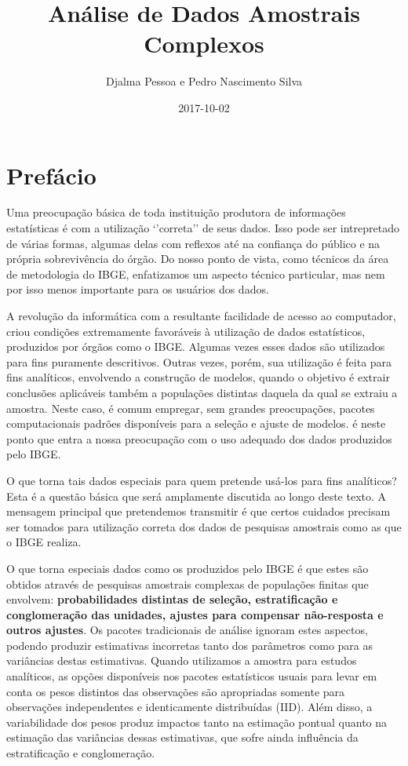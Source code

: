 \documentclass[]{book}
\title{Análise de Dados Amostrais Complexos}
\author{Djalma Pessoa e Pedro Nascimento Silva}
\date{2017-10-02}
\theoremstyle{definition}
\theoremstyle{definition}
\theoremstyle{definition}
\theoremstyle{remark}
\begin{document}
\maketitle

{
\setcounter{tocdepth}{1}
\tableofcontents
}
\chapter*{Prefácio}\label{prefacio}

Uma preocupação básica de toda instituição produtora de informações
estatísticas é com a utilização `'correta'' de seus dados. Isso pode ser
intrepretado de várias formas, algumas delas com reflexos até na
confiança do público e na própria sobrevivência do órgão. Do nosso ponto
de vista, como técnicos da área de metodologia do IBGE, enfatizamos um
aspecto técnico particular, mas nem por isso menos importante para os
usuários dos dados.

A revolução da informática com a resultante facilidade de acesso ao
computador, criou condições extremamente favoráveis à utilização de
dados estatísticos, produzidos por órgãos como o IBGE. Algumas vezes
esses dados são utilizados para fins puramente descritivos. Outras
vezes, porém, sua utilização é feita para fins analíticos, envolvendo a
construção de modelos, quando o objetivo é extrair conclusões aplicáveis
também a populações distintas daquela da qual se extraiu a amostra.
Neste caso, é comum empregar, sem grandes preocupações, pacotes
computacionais padrões disponíveis para a seleção e ajuste de modelos. é
neste ponto que entra a nossa preocupação com o uso adequado dos dados
produzidos pelo IBGE.

O que torna tais dados especiais para quem pretende usá-los para fins
analíticos? Esta é a questão básica que será amplamente discutida ao
longo deste texto. A mensagem principal que pretendemos transmitir é que
certos cuidados precisam ser tomados para utilização correta dos dados
de pesquisas amostrais como as que o IBGE realiza.

O que torna especiais dados como os produzidos pelo IBGE é que estes são
obtidos através de pesquisas amostrais complexas de populações finitas
que envolvem: \textbf{probabilidades distintas de seleção,
estratificação e conglomeração das unidades, ajustes para compensar
não-resposta e outros ajustes}. Os pacotes tradicionais de análise
ignoram estes aspectos, podendo produzir estimativas incorretas tanto
dos parâmetros como para as variâncias destas estimativas. Quando
utilizamos a amostra para estudos analíticos, as opções disponíveis nos
pacotes estatísticos usuais para levar em conta os pesos distintos das
observações são apropriadas somente para observações independentes e
identicamente distribuídas (IID). Além disso, a variabilidade dos pesos
produz impactos tanto na estimação pontual quanto na estimação das
variâncias dessas estimativas, que sofre ainda influência da
estratificação e conglomeração.
\end{document}
